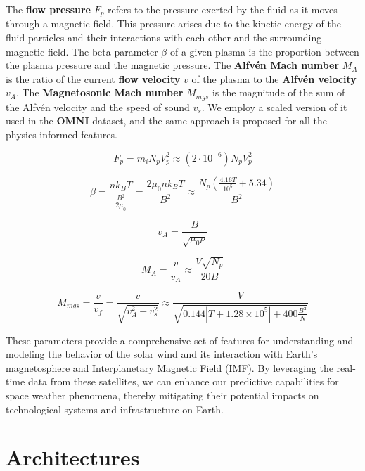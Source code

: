 \documentclass{article}
\begin{document}
The \textbf{flow pressure} $F_p$ refers to the pressure exerted by the fluid as it moves through a magnetic field. This pressure arises due to the kinetic energy of the fluid particles and their interactions with each other and the surrounding magnetic field. The beta parameter $\beta$ of a given plasma is the proportion between the plasma pressure and the magnetic pressure. The \textbf{Alfvén Mach number} $M_A$ is the ratio of the current \textbf{flow velocity} $v$ of the plasma to the \textbf{Alfvén velocity} $v_A$. The \textbf{Magnetosonic Mach number} $M_{mgs}$ is the magnitude of the sum of the Alfvén velocity and the speed of sound $v_s$. We employ a scaled version of it used in the \textbf{OMNI} dataset, and the same approach is proposed for all the physics-informed features.

\begin{equation}
F_p = m_i N_p V_p^2 \approx (2 \cdot 10^{-6}) N_p V_p^{2}
\end{equation}

\begin{equation}
\beta = \frac{nk_BT}{\frac{B^2}{2\mu_0}} = \frac{2\mu_0nk_BT}{B^2} \approx \frac{N_p (\frac{4.16T}{10^5} + 5.34)}{B^2}
\end{equation}

\begin{equation}
v_A = \frac{B}{\sqrt{\mu_0\rho}}
\end{equation}

\begin{equation}
M_A = \frac{v}{v_A} \approx \frac{V \sqrt{N_p}}{20B}
\end{equation}

\begin{equation}
M_{mgs} = \frac{v}{v_f} = \frac{v}{\sqrt{v_A^2 + v_s^2}} \approx \frac{V}{\sqrt{0.144|T + 1.28 \times 10^5| + 400 \frac{B^2}{N}}}
\end{equation}

These parameters provide a comprehensive set of features for understanding and modeling the behavior of the solar wind and its interaction with Earth's magnetosphere and Interplanetary Magnetic Field (IMF). By leveraging the real-time data from these satellites, we can enhance our predictive capabilities for space weather phenomena, thereby mitigating their potential impacts on technological systems and infrastructure on Earth.

\section{Architectures}
\end{document}
